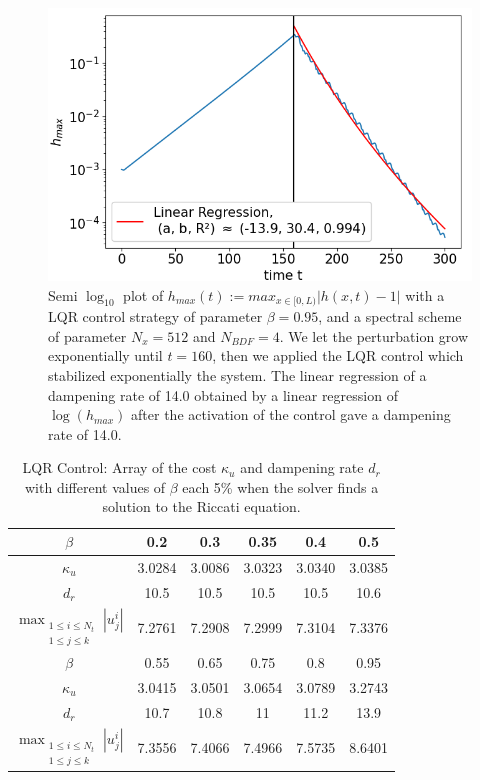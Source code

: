 \documentclass[12pt]{article}
\begin{document}
\begin{figure}
    \centering
    \includegraphics[width=0.7\linewidth]{Control_experiments/LQR_beta_0.95.png}
    \caption{Semi $\log_{10}$ plot of $h_{max}(t):=max_{x\in [0, L)}|h(x,t)-1|$ with a LQR control strategy of parameter $\beta=0.95$, and a spectral scheme of parameter $N_x = 512$ and $N_{BDF}=4$. We let the perturbation grow exponentially until $t=160$, then we applied the LQR control which stabilized exponentially the system. The linear regression of  a dampening rate of 14.0 obtained by a linear regression of $\log(h_{max})$ after the activation of the control gave a dampening rate of 14.0.  }
    \label{fig:LQR_beta_0.95}
\end{figure}
\vspace{0.5cm}


\begin{table}[ht]
    \caption{LQR Control: Array of the cost $\kappa_u$ and dampening rate $d_r$ with different values of $\beta$ each 5\%
    when the solver finds a solution to the Riccati equation.}
    \label{tab:LQR_cost_beta}
    \centering
        \begin{tabular}{ |c|c|c|c|c|c| }
        \hline
        $\beta$ & 0.2 & 0.3 & 0.35 & 0.4 & 0.5 \\
        \hline
        $\kappa_u$ & 3.0284 & 3.0086 & 3.0323 & 3.0340 &3.0385 \\ 
        $d_r$ & 10.5 & 10.5 & 10.5 & 10.5 & 10.6\\
        $\max_{\substack{1\leq i \leq N_t \\ 1\leq j \leq k}}|u_j^i|$ &7.2761 & 7.2908& 7.2999& 7.3104&7.3376\\
        \hline
        $\beta$ & 0.55 & 0.65 & 0.75 & 0.8 & 0.95 \\
        \hline
        $\kappa_u$ & 3.0415 & 3.0501 & 3.0654 & 3.0789 &3.2743 \\ 
        $d_r$ & 10.7 & 10.8 & 11 & 11.2 & 13.9\\
        $\max_{\substack{1\leq i \leq N_t \\ 1\leq j \leq k}}|u_j^i|$  & 7.3556 & 7.4066& 7.4966&7.5735& 8.6401\\
        \hline
        \end{tabular}
\end{table}
\end{document}
